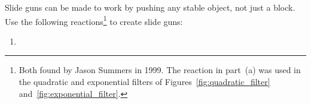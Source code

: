 \begin{multicols}{2}
	
	\mfilbreak
	
	
	\begin{problem}\label{exer:slide_gun_honey_farm} 
		Slide guns can be made to work by pushing any stable object, not just a block. Use the following reactions\footnote{Both found by Jason Summers in 1999. The reaction in part~(a) was used in the quadratic and exponential filters of Figures~\ref{fig:quadratic_filter} and~\ref{fig:exponential_filter}.} to create slide guns:\\[0.05cm]
		
		\begin{enumerate}[label=\bf\color{ocre}(\alph*)]
			\item {}\\[0.1cm]
			

\end{enumerate}
\end{problem}
\end{multicols}
